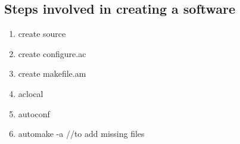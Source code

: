 \subsection{Steps involved in creating a software}
\begin{enumerate}
\item create source 
\item create configure.ac
\item create makefile.am
\item aclocal
\item autoconf
\item automake -a //to add missing files
\end{enumerate}



